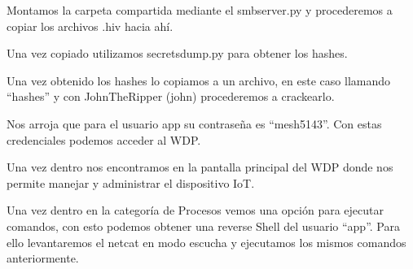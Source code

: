 \documentclass{article}
\begin{document}
Montamos la carpeta compartida mediante el smbserver.py y procederemos a copiar los archivos .hiv hacia ahí.
\begin{figure}[H]
	\center
	\caption{}
\end{figure}
\begin{figure}[H]
	\center
	\caption{}
\end{figure}
\begin{figure}[H]
	\center
	\caption{}
\end{figure}

Una vez copiado utilizamos secretsdump.py para obtener los hashes.
\begin{figure}[H]
	\center
	\caption{}
\end{figure}

Una vez obtenido los hashes lo copiamos a un archivo, en este caso llamando “hashes” y con JohnTheRipper (john) procederemos a crackearlo.
\begin{figure}[H]
	\center
	\caption{}
\end{figure}

Nos arroja que para el usuario app su contraseña es “mesh5143”. Con estas credenciales podemos acceder al WDP.
\begin{figure}[H]
	\center
	\caption{}
\end{figure}

Una vez dentro nos encontramos en la pantalla principal del WDP donde nos permite manejar y administrar el dispositivo IoT.
\begin{figure}[H]
	\center
	\caption{}
\end{figure}
\begin{figure}[H]
	\center
	\caption{}
\end{figure}
\begin{figure}[H]
	\center
	\caption{}
\end{figure}

Una vez dentro en la categoría de Procesos vemos una opción para ejecutar comandos, con esto podemos obtener una reverse Shell del usuario “app”. Para ello levantaremos el netcat en modo escucha y ejecutamos los mismos comandos anteriormente.
\begin{figure}[H]
	\center
	\caption{}
\end{figure}
\begin{figure}[H]
	\center
	\caption{}
\end{figure}
\end{document}
